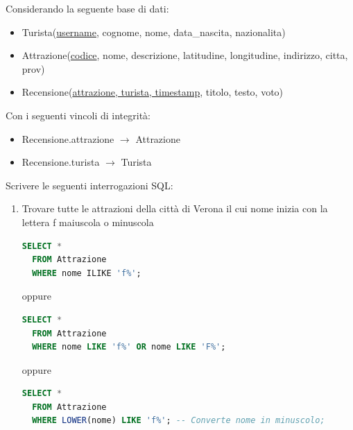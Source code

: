 \documentclass[a4paper]{article}
\begin{document}
\begin{exercise}
  Considerando la seguente base di dati:
  \begin{itemize}
    \item Turista(\underline{username}, cognome, nome, data\_nascita, nazionalita)

    \item Attrazione(\underline{codice}, nome, descrizione, latitudine, longitudine,
      indirizzo, citta, prov)

    \item Recensione(\underline{attrazione, turista, timestamp}, titolo, testo, voto)
  \end{itemize}
  \noindent
  Con i seguenti vincoli di integrità:
  \begin{itemize}
    \item Recensione.attrazione $\to$ Attrazione
    \item Recensione.turista $\to$ Turista
  \end{itemize}
  \noindent
  Scrivere le seguenti interrogazioni SQL:
  \begin{enumerate}
    \item Trovare tutte le attrazioni della città di Verona il cui nome inizia con la
      lettera f maiuscola o minuscola
\begin{lstlisting}[language=SQL]
SELECT *
  FROM Attrazione
  WHERE nome ILIKE 'f%';
\end{lstlisting}
      oppure
\begin{lstlisting}[language=SQL]
SELECT *
  FROM Attrazione
  WHERE nome LIKE 'f%' OR nome LIKE 'F%';
\end{lstlisting}
      oppure
\begin{lstlisting}[language=SQL]
SELECT *
  FROM Attrazione
  WHERE LOWER(nome) LIKE 'f%'; -- Converte nome in minuscolo;
\end{lstlisting}



\end{enumerate}
\end{exercise}
\end{document}

